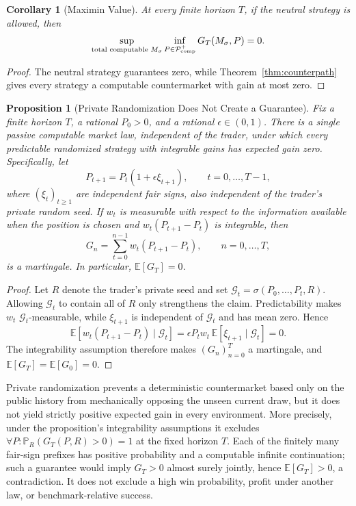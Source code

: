 \documentclass[aps,pra,reprint,superscriptaddress,amsmath,amssymb,floatfix]{revtex4-2}
\theoremstyle{plain}
\newtheorem{corollary}[theorem]{Corollary}
\newtheorem{proposition}[theorem]{Proposition}
\theoremstyle{definition}
\theoremstyle{remark}
\begin{document}
\begin{corollary}[Maximin Value]
  \label{cor:maximin}
  At every finite horizon \(T\), if the neutral strategy is allowed, then
  \[
    \sup_{\text{\rm total computable }M_\sigma}
    \inf_{P\in\mathcal P_{\mathrm{comp}}^{+}}
    G_T(M_\sigma,P)=0.
  \]
\end{corollary}

\begin{proof}
The neutral strategy guarantees zero, while
Theorem~\ref{thm:counterpath} gives every strategy a computable countermarket
with gain at most zero.
\end{proof}

\begin{proposition}[Private Randomization Does Not Create a Guarantee]
  \label{prop:randomized}
  Fix a finite horizon \(T\), a rational \(P_0>0\), and a rational
  \(\epsilon\in(0,1)\). There is a single passive computable market law,
  independent of the trader, under which every predictable randomized strategy
  with integrable gains has expected gain zero. Specifically, let
  \[
    P_{t+1}=P_t(1+\epsilon\xi_{t+1}),
    \qquad t=0,\ldots,T-1,
  \]
  where \((\xi_t)_{t\geq1}\) are independent fair signs, also independent of
  the trader's private random seed. If \(w_t\) is measurable with respect to
  the information available when the position is chosen and
  \(w_t(P_{t+1}-P_t)\) is integrable, then
  \[
    G_n=\sum_{t=0}^{n-1}w_t(P_{t+1}-P_t),
    \qquad n=0,\ldots,T,
  \]
  is a martingale. In particular, \(\mathbb E[G_T]=0\).
\end{proposition}

\begin{proof}
Let \(R\) denote the trader's private seed and set
\(\mathcal G_t=\sigma(P_0,\ldots,P_t,R)\). Allowing \(\mathcal G_t\) to contain
all of \(R\) only strengthens the claim. Predictability makes \(w_t\)
\(\mathcal G_t\)-measurable, while \(\xi_{t+1}\) is independent of
\(\mathcal G_t\) and has mean zero. Hence
\[
 \mathbb E\!\left[
   w_t(P_{t+1}-P_t)\mid\mathcal G_t
 \right]
 =\epsilon P_t w_t\,
   \mathbb E[\xi_{t+1}\mid\mathcal G_t]
 =0.
\]
The integrability assumption therefore makes \((G_n)_{n=0}^T\) a martingale,
and \(\mathbb E[G_T]=\mathbb E[G_0]=0\).
\end{proof}

Private randomization prevents a deterministic countermarket based only on the
public history from mechanically opposing the unseen current draw, but it does
not yield strictly positive expected gain in every environment. More precisely,
under the proposition's integrability assumptions it excludes
\(\forall P:\mathbb P_R(G_T(P,R)>0)=1\) at the fixed horizon \(T\).
Each of the finitely many fair-sign prefixes has positive probability and a
computable infinite continuation; such a guarantee would imply
\(G_T>0\) almost surely jointly, hence \(\mathbb E[G_T]>0\), a contradiction.
It does not exclude a high win probability, profit under another law, or
benchmark-relative success.
\end{document}
